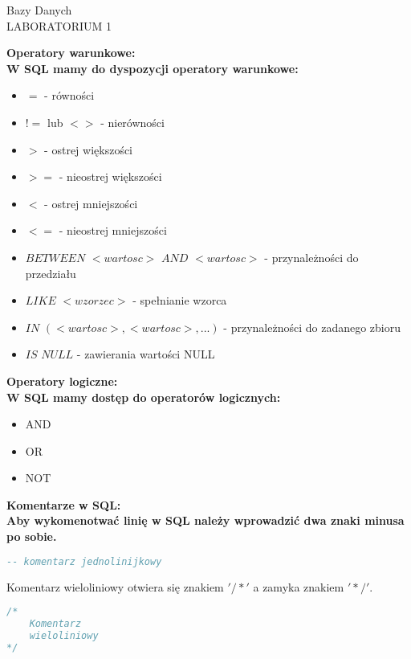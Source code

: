 \documentclass[a4paper,12pt]{article}
\newcommand{\h}[1]{\noindent \bf #1 \rm \\ \noindent}
\begin{document}
\begin{center}
	\LARGE
	Bazy Danych \\
	\large
	LABORATORIUM 1 
\end{center}
\vspace{1cm}

\h{Operatory warunkowe:}
W SQL mamy do dyspozycji operatory warunkowe:
\begin{itemize}
	\item $=$ - równości
	\item $!=$ lub $<>$ - nierówności
	\item $>$ -  ostrej większości
	\item $>=$ - nieostrej większości
	\item $<$ - ostrej mniejszości
	\item $<=$ - nieostrej mniejszości 
	\item $BETWEEN$ $<wartosc>$ $AND$ $<wartosc>$ - przynależności do przedziału
	\item $LIKE$ $<wzorzec>$ - spełnianie wzorca
	\item $IN$ $(<wartosc>, <wartosc>, ...)$ - przynależności do zadanego zbioru
	\item $IS$ $NULL$ - zawierania wartości NULL
\end{itemize}
\vspace{5mm}

\h{Operatory logiczne:}
W SQL mamy dostęp do operatorów logicznych:
\begin{itemize}
	\item AND
	\item OR
	\item NOT
\end{itemize}
\vspace{5mm}

\h{Komentarze w SQL:}
Aby wykomenotwać linię w SQL należy wprowadzić dwa znaki minusa po sobie.
\begin{lstlisting}[language=SQL]
-- komentarz jednolinijkowy
\end{lstlisting}

\noindent
Komentarz wieloliniowy otwiera się znakiem $'/*'$ a zamyka znakiem $'*/'$.
\begin{lstlisting}[language=SQL]
/* 
	Komentarz
	wieloliniowy
*/
\end{lstlisting}
\vspace{5mm}
\end{document}
